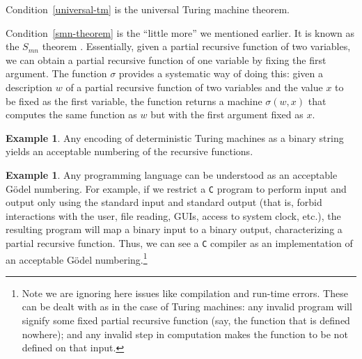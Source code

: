 \documentclass[12pt]{article}
\theoremstyle{definition}
\newtheorem{example}[definition]{Example}
\begin{document}
Condition~\ref{universal-tm} is the universal Turing machine theorem.

Condition~\ref{smn-theorem} is the ``little more'' we mentioned earlier.
It is known as the $S_{mn}$ theorem \cite[p.~24]{Rogers1987}.
Essentially,
given a partial recursive function of two variables,
we can obtain a partial recursive function of one variable
by fixing the first argument.
The function $\sigma$ provides a systematic way of doing this:
given a description $w$ of a partial recursive function of two variables
and the value $x$ to be fixed as the first variable,
the function returns a machine $\sigma(w, x)$
that computes the same function as $w$ but with the first argument fixed as $x$.

\begin{example}\label{standard-numbering}
    Any encoding of deterministic Turing machines as a binary string
    yields an acceptable numbering of the recursive functions.
\end{example}

\begin{example}\label{c}
    Any programming language can be understood as an acceptable Gödel numbering.
    For example,
    if we restrict a \texttt C program
    to perform input and output only using the standard input and standard output
    (that is, forbid interactions with the user, file reading, GUIs,
    access to system clock, etc.),
    the resulting program will map a binary input to a binary output,
    characterizing a partial recursive function.
    Thus, we can see a \texttt C compiler
    as an implementation of an acceptable Gödel numbering.\footnote{
        Note we are ignoring here issues like compilation and run-time errors.
        These can be dealt with as in the case of Turing machines:
        any invalid program will signify some fixed partial recursive function
        (say, the function that is defined nowhere);
        and any invalid step in computation
        makes the function to be not defined on that input.
    }
\end{example}
\end{document}
